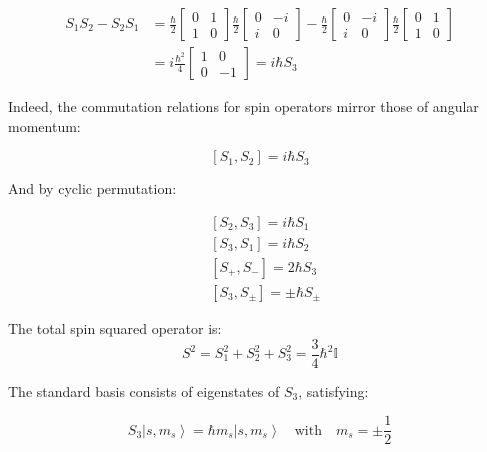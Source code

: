\documentclass[italian]{HKNdocument}
\begin{document}
\begin{align}
S_1 S_2 - S_2 S_1 &= \frac{\hbar}{2}\left[\begin{array}{ll}
0 & 1 \\
1 & 0
\end{array}\right] \frac{\hbar}{2}\left[\begin{array}{cc}
0 & -i \\
i & 0
\end{array}\right] - \frac{\hbar}{2}\left[\begin{array}{cc}
0 & -i \\
i & 0
\end{array}\right] \frac{\hbar}{2}\left[\begin{array}{ll}
0 & 1 \\
1 & 0
\end{array}\right] \\
&= i\frac{\hbar^{2}}{4}\left[\begin{array}{cc}
1 & 0 \\
0 & -1
\end{array}\right] = i\hbar S_3
\end{align}


Indeed, the commutation relations for spin operators mirror those of angular momentum:

\begin{equation}
\left[S_{1}, S_{2}\right]=i \hbar S_{3}
\end{equation}

And by cyclic permutation:

\begin{align}
& {\left[S_{2}, S_{3}\right]=i \hbar S_{1}} \\
& {\left[S_{3}, S_{1}\right]=i \hbar S_{2}} \\
& {\left[S_{+}, S_{-}\right]=2 \hbar S_{3}}  \\
& {\left[S_{3}, S_{\pm}\right]=\pm \hbar S_{\pm}}
\end{align}

The total spin squared operator is:
\begin{equation}
S^{2}=S_{1}^{2}+S_{2}^{2}+S_{3}^{2}=\frac{3}{4} \hbar^{2} \mathbb{I}
\end{equation}

The standard basis consists of eigenstates of $S_3$, satisfying:

\begin{equation}
S_{3}\left|s, m_{s}\right\rangle=\hbar m_{s}\left|s, m_{s}\right\rangle \quad \text{with} \quad m_{s}=\pm\frac{1}{2}
\end{equation}
\end{document}
